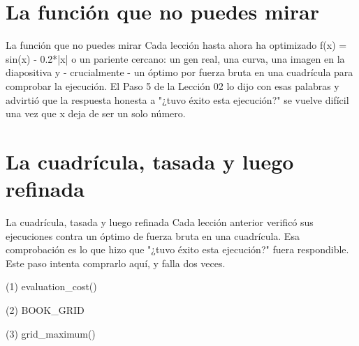 \section{La función que no puedes mirar}

\begin{frame}{La función que no puedes mirar}
Cada lección hasta ahora ha optimizado f(x) = sin(x) - 0.2*|x| o un pariente cercano:
un gen real, una curva, una imagen en la diapositiva y - crucialmente - un
óptimo por fuerza bruta en una cuadrícula para comprobar la ejecución. El Paso 5 de la Lección 02 lo dijo
con esas palabras y advirtió que la respuesta honesta a "¿tuvo éxito esta ejecución?"
se vuelve difícil una vez que x deja de ser un solo número.
\end{frame}


\section{La cuadrícula, tasada y luego refinada}

\begin{frame}{La cuadrícula, tasada y luego refinada}
Cada lección anterior verificó sus ejecuciones contra un óptimo de fuerza bruta en una cuadrícula.
Esa comprobación es lo que hizo que "¿tuvo éxito esta ejecución?" fuera respondible. Este paso intenta
comprarlo aquí, y falla dos veces.
\end{frame}

\begin{frame}[fragile]{(1) evaluation\_cost()}

\end{frame}

\begin{frame}[fragile]{(2) BOOK\_GRID}

\end{frame}

\begin{frame}[fragile]{(3) grid\_maximum()}

\end{frame}

